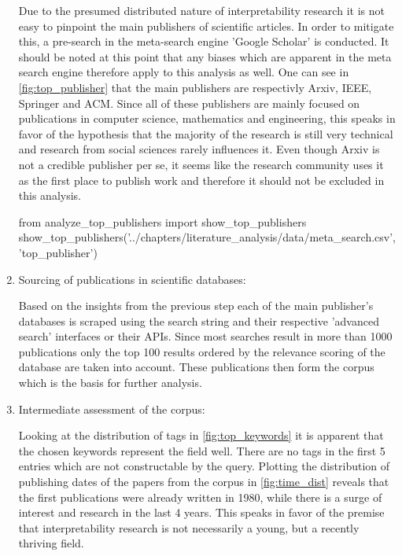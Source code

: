 \begin{enumerate}
	Due to the presumed distributed nature of interpretability research it is not easy to pinpoint the main publishers of scientific articles. In order to mitigate this, a pre-search in the meta-search engine 'Google Scholar' is conducted. It should be noted at this point that any biases which are apparent in the meta search engine therefore apply to this analysis as well. One can see in \autoref{fig:top_publisher} that the main publishers are respectivly Arxiv, IEEE, Springer and ACM. Since all of these publishers are mainly focused on publications in computer science, mathematics and engineering, this speaks in favor of the hypothesis that the majority of the research is still very technical and research from social sciences rarely influences it. Even though Arxiv is not a credible publisher per se, it seems like the research community uses it as the first place to publish work and therefore it should not be excluded in this analysis. 
	
\begin{pycode}
from analyze_top_publishers import show_top_publishers
show_top_publishers('../chapters/literature_analysis/data/meta_search.csv', 'top_publisher')
\end{pycode}

	\item Sourcing of publications in scientific databases:
	
	Based on the insights from the previous step each of the main publisher's databases is scraped using the search string and their respective 'advanced search' interfaces or their APIs. Since most searches result in more than 1000 publications only the top 100 results ordered by the relevance scoring of the database are taken into account. These publications then form the corpus which is the basis for further analysis.
	
	\item Intermediate assessment of the corpus:
	
	Looking at the distribution of tags in \autoref{fig:top_keywords} it is apparent that the chosen keywords represent the field well. There are no tags in the first 5 entries which are not constructable by the query.
	Plotting the distribution of publishing dates of the papers from the corpus in \autoref{fig:time_dist} reveals that the first publications were already written in 1980, while there is a surge of interest and research in the last 4 years. This speaks in favor of the premise that interpretability research is not necessarily a young, but a recently thriving field.
	

\end{enumerate}
